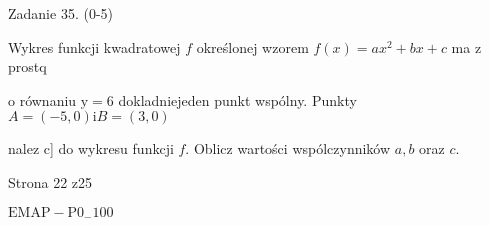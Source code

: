 \documentclass[a4paper,12pt]{article}
\begin{document}
Zadanie 35. (0-5)

Wykres funkcji kwadratowej $f$ określonej wzorem $f(x)=ax^{2}+bx+c$ ma z prostq

o równaniu $\mathrm{y}=6$ dokladniejeden punkt wspólny. Punkty $A=(-5,0) \mathrm{i} B=(3,0)$

nalez $\mathrm{c}$] do wykresu funkcji $f$. Oblicz wartości wspólczynników $a, b$ oraz $c.$

Strona 22 z25

$\mathrm{E}\mathrm{M}\mathrm{A}\mathrm{P}-\mathrm{P}0_{-}100$
\end{document}

